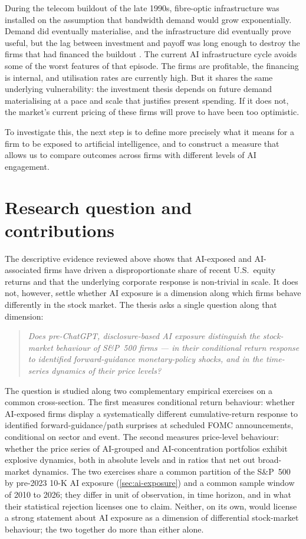 During the telecom buildout of the late 1990s, fibre-optic infrastructure was installed on the assumption that bandwidth demand would grow exponentially. Demand did eventually materialise, and the infrastructure did eventually prove useful, but the lag between investment and payoff was long enough to destroy the firms that had financed the buildout \citep{golan2025}. The current AI infrastructure cycle avoids some of the worst features of that episode. The firms are profitable, the financing is internal, and utilisation rates are currently high. But it shares the same underlying vulnerability: the investment thesis depends on future demand materialising at a pace and scale that justifies present spending. If it does not, the market's current pricing of these firms will prove to have been too optimistic.

To investigate this, the next step is to define more precisely what it means for a firm to be exposed to artificial intelligence, and to construct a measure that allows us to compare outcomes across firms with different levels of AI engagement.

\section{Research question and contributions}
\label{sec:intro-rq}

The descriptive evidence reviewed above shows that AI-exposed and
AI-associated firms have driven a disproportionate share of recent
U.S.\ equity returns and that the underlying corporate response is
non-trivial in scale. It does not, however, settle whether AI exposure
is a dimension along which firms behave differently in the stock
market. The thesis asks a single question along that dimension:

\begin{quote}
\emph{Does pre-ChatGPT, disclosure-based AI exposure distinguish the
stock-market behaviour of S\&P~500 firms --- in their conditional
return response to identified forward-guidance monetary-policy
shocks, and in the time-series dynamics of their price levels?}
\end{quote}

The question is studied along two complementary empirical exercises
on a common cross-section. The first measures conditional return
behaviour: whether AI-exposed firms display a systematically different
cumulative-return response to identified forward-guidance/path
surprises at scheduled FOMC announcements, conditional on sector and
event. The second measures price-level behaviour: whether the price
series of AI-grouped and AI-concentration portfolios exhibit
explosive dynamics, both in absolute levels and in ratios that net
out broad-market dynamics. The two exercises share a common partition
of the S\&P~500 by pre-2023 10-K AI exposure
(\cref{sec:ai-exposure}) and a common sample window of 2010 to 2026;
they differ in unit of observation, in time horizon, and in what
their statistical rejection licenses one to claim. Neither, on its
own, would license a strong statement about AI exposure as a
dimension of differential stock-market behaviour; the two together
do more than either alone.

